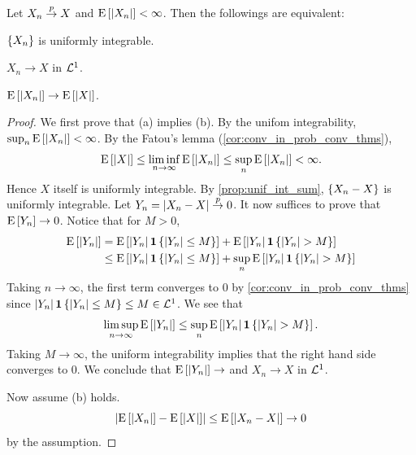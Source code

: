 \begin{theorem}\label{thm:L1_conv_unif_int}
    Let $X_n\pto X$ and $\E\sbrc{\abs{X_n}}<\infty$. Then the followings are equivalent:
    \begin{thmenum}
        \item $\set{X_n}$ is uniformly integrable. 
        \item $X_n\to X$ in $\L^1$. 
        \item $\E\sbrc{\abs{X_n}}\to\E\sbrc{\abs{X}}$. 
    \end{thmenum}
\end{theorem}
\begin{proof}
    We first prove that (a) implies (b). By the unifom integrability, $\sup_n\E\sbrc{\abs{X_n}}<\infty$. 
    By the Fatou's lemma (\cref{cor:conv_in_prob_conv_thms}), 
    \begin{equation*}
        \E\sbrc{\abs{X}} \leq \liminf_{n\to\infty}\E\sbrc{\abs{X_n}}\leq \sup_n\E\sbrc{\abs{X_n}}<\infty.
    \end{equation*}
    Hence $X$ itself is uniformly integrable. By \cref{prop:unif_int_sum}, $\set{X_n-X}$ is 
    uniformly integrable. Let $Y_n = \abs{X_n-X}\pto 0$. It now suffices to prove that $\E\sbrc{Y_n}\to 0$. 
    Notice that for $M>0$, 
    \begin{equation*}
        \begin{split}
            \E\sbrc{\abs{Y_n}} 
            &= \E\sbrc{\abs{Y_n}\one\set{\abs{Y_n}\leq M}} + \E\sbrc{\abs{Y_n}\one\set{\abs{Y_n}>M}} \\ 
            &\leq \E\sbrc{\abs{Y_n}\one\set{\abs{Y_n}\leq M}} + \sup_n\E\sbrc{\abs{Y_n}\one\set{\abs{Y_n}>M}}
        \end{split}
    \end{equation*}
    Taking $n\to\infty$, the first term converges to $0$ by \cref{cor:conv_in_prob_conv_thms} since
    $\abs{Y_n}\one\set{\abs{Y_n}\leq M}\leq M\in\L^1$. We see that 
    \begin{equation*}
        \limsup_{n\to\infty}\E\sbrc{\abs{Y_n}}\leq \sup_n\E\sbrc{\abs{Y_n}\one\set{\abs{Y_n}>M}}.
    \end{equation*} 
    Taking $M\to\infty$, the uniform integrability implies that the right hand side 
    converges to $0$. We conclude that $\E\sbrc{\abs{Y_n}}\to $ and $X_n\to X$ in $\L^1$. 

    Now assume (b) holds. 
    \begin{equation*}
        \abs{\E\sbrc{\abs{X_n}} - \E\sbrc{\abs{X}}}\leq \E\sbrc{\abs{X_n-X}}\to 0
    \end{equation*}
    by the assumption. 
    

\end{proof}
